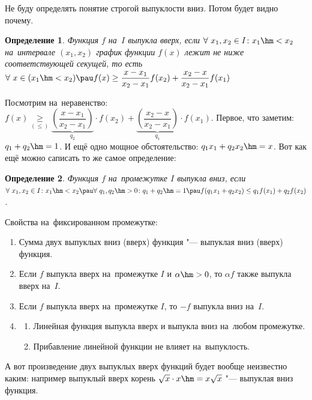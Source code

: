 \documentclass[a4paper,10pt,twoside]{article}
\newtheorem{Def}{Определение}[section]
\begin{document}
Не буду определять понятие строгой выпуклости вниз. Потом будет видно почему.

\begin{Def}
    Функция $f$ на~$I$ выпукла вверх, если $\forall\  x_1,x_2\in I\colon x_1\hm<x_2$ на~интервале $(x_1,x_2)$ график функции $f(x)$ лежит не ниже
    соответствующей секущей, то есть \\$\forall\  x\in (x_1\hm<x_2)\pau f(x)\geq\dfrac{x-x_1}{x_2-x_1}f(x_2)+\dfrac{x_2-x}{x_2-x_1}f(x_1)$
\end{Def}

Посмотрим на~неравенство: $f(x)\underset{(\leq)}{\geq}\underbrace{\left(\dfrac{x-x_1}{x_2-x_1}\right)}_{q_2}\cdot f(x_2)+\underbrace{\left(\dfrac{x_2-x}{x_2-x_1}\right)}_{q_1}\cdot f(x_1)$.
Первое, что заметим: $q_1+q_2\hm=1$. И ещё одно мощное обстоятельство: $q_1x_1+q_2x_2\hm=x$. Вот как ещё можно саписать то же самое определение:

\begin{Def}\label{dv1}
    Функция $f$ на~промежутке $I$ выпукла вниз, если \\$\forall\  x_1,x_2\in I\colon x_1\hm<x_2\pau \forall\  q_1,q_2\hm>0\colon  q_1+q_2\hm=1\pau
    f(q_1x_1+q_2x_2)\leq q_1f(x_1)+q_2f(x_2)$.
\end{Def}

Свойства на~фиксированном промежутке:

\begin{enumerate}
    \item Сумма двух выпуклых вниз (вверх) функция "--- выпуклая вниз (вверх) функция.

    \item Если $f$ выпукла вверх на~промежутке $I$ и $\alpha\hm>0$, то $\alpha f$ также выпукла вверх на~$I$.

    \item Если $f$ выпукла вверх на~промежутке $I$, то $-f$ выпукла вниз на~$I$.

    \item \begin{enumerate}
        \item Линейная функция выпукла вверх и выпукла вниз на~любом промежутке.

        \item Прибавление линейной функции не влияет на~выпуклость.
    \end{enumerate}
\end{enumerate}

А вот произведение двух выпуклых вверх функций будет вообще неизвестно каким: например выпуклый вверх корень $\sqrt x\cdot x\hm=x\sqrt x$ "--- выпуклая вниз функция.
\end{document}
